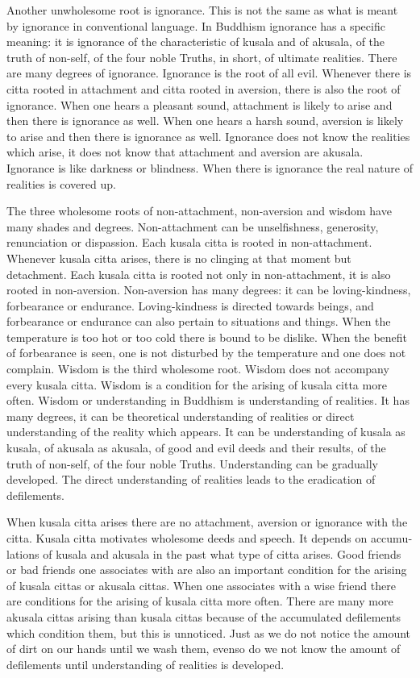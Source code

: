 \documentclass{book}
\begin{document}
Another unwholesome root is ignorance. This is not the same as what is
meant by ignorance in conventional language. In Buddhism ignorance has a
specific meaning: it is ignorance of the characteristic of kusala and of
akusala, of the truth of non-self, of the four noble Truths, in short,
of ultimate realities. There are many degrees of ignorance. Ignorance is
the root of all evil. Whenever there is citta rooted in attachment and
citta rooted in aversion, there is also the root of ignorance. When one
hears a pleasant sound, attachment is likely to arise and then there is
ignorance as well. When one hears a harsh sound, aversion is likely to
arise and then there is ignorance as well. Ignorance does not know the
realities which arise, it does not know that attachment and aversion are
akusala. Ignorance is like darkness or blindness. When there is
ignorance the real nature of realities is covered up.

The three wholesome roots of non-attachment, non-aversion and wisdom
have many shades and degrees. Non-attachment can be unselfishness,
generosity, renun­cia­tion or dispassion. Each kusala citta is rooted in
non-attachment. Whenever kusala citta arises, there is no clinging at
that moment but detachment. Each kusala citta is rooted not only in
non-attachment, it is also rooted in non-aversion. Non-aversion has many
degrees: it can be loving-kindness, forbearance or endurance.
Loving-kindness is directed towards beings, and forbearance or
endur­ance can also pertain to situations and things. When the
temperature is too hot or too cold there is bound to be dislike. When
the benefit of forbearance is seen, one is not disturbed by the
temperature and one does not complain. Wisdom is the third wholesome
root. Wisdom does not accompany every kusala citta. Wisdom is a condition
for the arising of kusala citta more often. Wisdom or understanding in
Buddhism is understanding of realities. It has many degrees, it can be
theoretical understanding of realities or direct understanding of the
reality which appears. It can be understanding of kusala as kusala, of
akusala as akusala, of good and evil deeds and their results, of the
truth of non-self, of the four noble Truths. Understanding can be
gradually developed. The direct understanding of realities leads to the
eradication of defilements.

When kusala citta arises there are no attachment, aversion or
ignorance with the citta. Kusala citta motivates wholesome deeds and
speech. It depends on accumu­lations of kusala and akusala in the past
what type of citta arises. Good friends or bad friends one associates
with are also an important condition for the arising of kusala cittas or
akusala cittas. When one associates with a wise friend there are
conditions for the arising of kusala citta more often. There are many
more akusala cittas arising than kusala cittas because of the
accumulated defilements which condition them, but this is unnoticed.
Just as we do not notice the amount of dirt on our hands until we wash
them, evenso do we not know the amount of defilements until
understanding of realities is developed.
\end{document}
